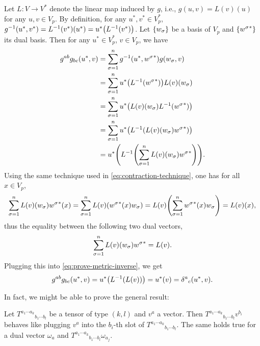 \documentclass{note}
\numberwithin{equation}{chapter}
\begin{document}
Let $L\colon V\to V^*$ denote the linear map induced by $g$, i.e., $g(u, v) =
    L(v)(u)$ for any $u, v \in V_p$. By definition, for any $u^*, v^* \in V_p^*$,
$g^{-1}(u^*, v^*) = L^{-1}(v^*)(u^*) = u^*\prn{L^{-1}(v^*)}$. Let
$\set{w_\sigma}$ be a basis of $V_p$ and $\set{{w^\sigma}^*}$ its dual basis.
Then for any $u^* \in V_p^*$, $v \in V_p$, we have
\begin{align}
    g^{ab}g_{bc}(u^*, v)
     & = \sum_{\sigma=1}^n g^{-1}\prn{u^*, {w^\sigma}^*} g\prn{w_\sigma, v} \notag     \\
     & = \sum_{\sigma=1}^n u^*\prn{L^{-1}\prn{{w^\sigma}^*}} L(v)\prn{w_\sigma} \notag \\
     & = \sum_{\sigma=1}^n u^*\prn{L(v)\prn{w_\sigma}L^{-1}\prn{{w^\sigma}^*}} \notag  \\
     & = \sum_{\sigma=1}^n u^*\prn{L^{-1}\prn{L(v)\prn{w_\sigma}{w^\sigma}^*}} \notag  \\
     & = u^*\prn{L^{-1}\prn{\sum_{\sigma=1}^n L(v)\prn{w_\sigma}{w^\sigma}^*}}.
    \label{eq:prove-metric-inverse}
\end{align}
Using the same technique used in \eqref{eq:contraction-technique}, one has for
all $x \in V_p$,
\begin{equation*}
    \sum_{\sigma=1}^n L(v)\prn{w_\sigma}{w^\sigma}^*(x) = \sum_{\sigma=1}^n
    L(v)\prn{{w^\sigma}^*(x) w_\sigma} = L(v)\prn{\sum_{\sigma=1}^n {w^\sigma}^*(x)
    w_\sigma} = L(v)(x),
\end{equation*}
thus the equality between the following two dual vectors,
\begin{equation*}
    \sum_{\sigma=1}^n L(v)\prn{w_\sigma}{w^\sigma}^* = L(v).
\end{equation*}
Plugging this into \eqref{eq:prove-metric-inverse}, we get
\begin{equation*}
    g^{ab}g_{bc}(u^*, v) = u^*\prn{L^{-1}(L(v))} = u^*(v) =
    {\delta^a}_c\prn{u^*,v}.
\end{equation*}

In fact, we might be able to prove the general result:
\begin{lemma*}
    Let ${T^{a_1\cdots a_k}}_{b_1\cdots b_l}$ be a tensor of type $(k,l)$ and $v^a$
    a vector. Then ${T^{a_1\cdots a_k}}_{b_1\cdots b_l}v^{b_i}$ behaves like
    plugging $v^a$ into the $b_i$-th slot of ${T^{a_1\cdots a_k}}_{b_1\cdots b_l}$.
    The same holds true for a dual vector $\omega_a$ and ${T^{a_1\cdots
                        a_k}}_{b_1\cdots b_l}\omega_{a_j}$.
\end{lemma*}
\end{document}
